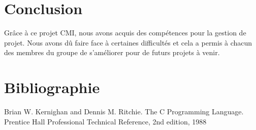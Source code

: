 \documentclass[a4paper, 12pt]{article}
\begin{document}
\newpage
\section*{Conclusion}
      Grâce à ce projet CMI, nous avons acquis des compétences pour la gestion de projet. Nous avons dû faire face à certaines difficultés et cela a permis à chacun des membres du groupe de s'améliorer pour de futurs projets à venir. 
      

 \newpage

\section*{Bibliographie}
       Brian W. Kernighan and Dennis M. Ritchie. The C Programming Language. Prentice Hall Professional Technical Reference, 2nd edition, 1988
\end{document}
